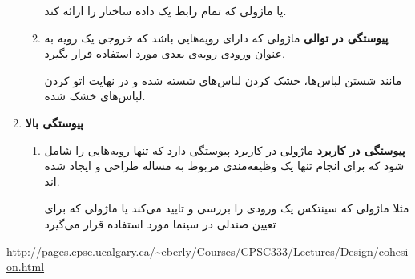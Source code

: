 \begin{enumerate}
\begin{enumerate}
یا ماژولی که تمام رابط یک داده ساختار را ارائه کند.
\item \textbf{پیوستگی در توالی} \newline
ماژولی که دارای رویه‌هایی باشد که خروجی یک رویه به عنوان ورودی رویه‌ی بعدی مورد استفاده قرار بگیرد.

مانند شستن لباس‌ها،
خشک کردن لباس‌های شسته شده و در نهایت اتو کردن لباس‌های خشک شده. 
\end{enumerate}
\item \textbf{پیوستگی بالا} \newline
\begin{enumerate}
\item \textbf{پیوستگی در کاربرد} \newline
ماژولی در کاربرد پیوستگی دارد که تنها رویه‌هایی را شامل شود که برای انجام تنها یک وظیفه‌مندی مربوط به مساله طراحی و ایجاد شده اند.

مثلا ماژولی که سینتکس یک ورودی را بررسی و تایید می‌کند یا ماژولی که برای تعیین صندلی در سینما مورد استفاده قرار می‌گیرد
\end{enumerate}
\end{enumerate}

\url{http://pages.cpsc.ucalgary.ca/~eberly/Courses/CPSC333/Lectures/Design/cohesion.html}
